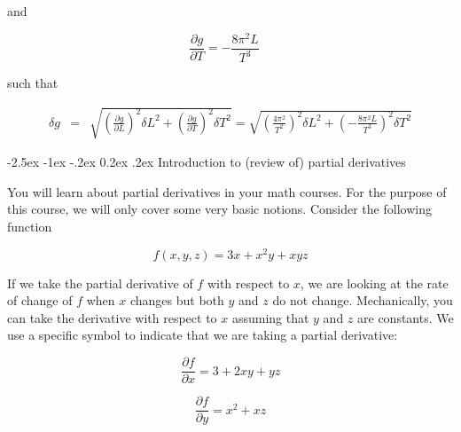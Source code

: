 \documentclass[11pt]{article}
\makeatletter
\renewcommand\subsection{\@startsection {subsection}{2}{\z@}%
     {-2.5ex \@plus -1ex \@minus -.2ex}%
     {0.2ex \@plus.2ex}%
    {\bfseries\large}}
\makeatother
\begin{document}
and

\begin{equation}
  \frac{\partial g}{\partial T} = -\frac{8\pi^2 L}{T^3}\quad
\end{equation}

such that


\begin{eqnarray}
  \delta g &=& \sqrt{\left( \frac{\partial g}{\partial L} \right)^2\delta L^2
                 + \left( \frac{\partial g}{\partial T} \right)^2\delta T^2}=\sqrt{\left( \frac{4\pi^2}{T^2} \right)^2 \delta L^2+
                 \left( -\frac{8\pi^2L}{T^3} \right)^2\delta T^2}
\end{eqnarray}


\subsection{Introduction to (review of) partial derivatives}

You will learn about partial derivatives in your math courses. For the purpose
of this course, we will only cover some very basic notions. Consider the
following function

\begin{equation}
f(x, y, z) = 3x + x^2y + xyz
\end{equation}

If we take the partial derivative of $f$ with respect to $x$, we are looking at
the rate of change of $f$ when $x$ changes but both $y$ and $z$ do not change.
Mechanically, you can take the derivative with respect to $x$ assuming that $y$
and $z$ are constants. We use a specific symbol to indicate that we are taking
a partial derivative:

\begin{equation}
\frac{\partial f}{\partial x} = 3 + 2xy + yz
\end{equation}

\begin{equation}
\frac{\partial f}{\partial y} = x^2 + xz
\end{equation}
\end{document}
